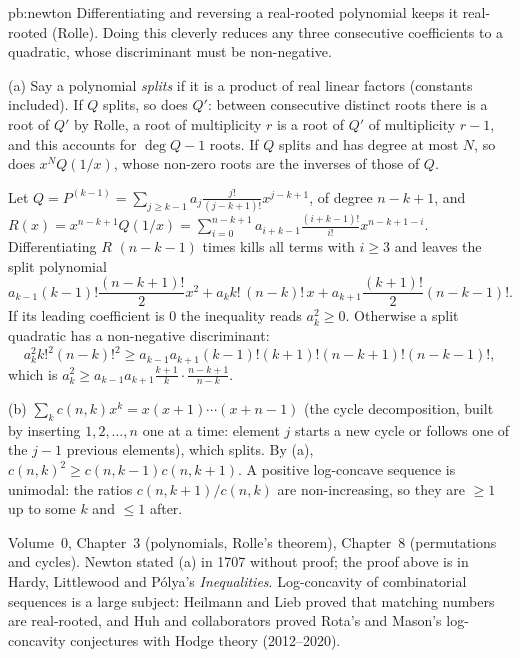 \begin{solution}{pb:newton}
\idea Differentiating and reversing a real-rooted polynomial keeps it real-rooted (Rolle). Doing this cleverly reduces any three
consecutive coefficients to a quadratic, whose discriminant must be non-negative.

\writeup (a) Say a polynomial \emph{splits} if it is a product of real linear factors (constants included). If $Q$ splits, so does $Q'$:
between consecutive distinct roots there is a root of $Q'$ by Rolle, a root of multiplicity $r$ is a root of $Q'$ of multiplicity
$r-1$, and this accounts for $\deg Q-1$ roots. If $Q$ splits and has degree at most $N$, so does $x^NQ(1/x)$, whose non-zero roots are the
inverses of those of $Q$.

Let $Q=P^{(k-1)}=\sum_{j\ge k-1}a_j\frac{j!}{(j-k+1)!}x^{j-k+1}$, of degree $n-k+1$, and $R(x)=x^{n-k+1}Q(1/x)=\sum_{i=0}^{n-k+1}a_{i+k-1}\frac{(i+k-1)!}{i!}x^{n-k+1-i}$.
Differentiating $R$ $(n-k-1)$ times kills all terms with $i\ge3$ and leaves the split polynomial
\[
a_{k-1}(k-1)!\frac{(n-k+1)!}2x^2+a_kk!\,(n-k)!\,x+a_{k+1}\frac{(k+1)!}2(n-k-1)!.
\]
If its leading coefficient is $0$ the inequality reads $a_k^2\ge0$. Otherwise a split quadratic has a non-negative discriminant:
\[
a_k^2k!^2(n-k)!^2\ge a_{k-1}a_{k+1}(k-1)!(k+1)!(n-k+1)!(n-k-1)!,
\]
which is $a_k^2\ge a_{k-1}a_{k+1}\frac{k+1}k\cdot\frac{n-k+1}{n-k}$.

(b) $\sum_kc(n,k)x^k=x(x+1)\cdots(x+n-1)$ (the cycle decomposition, built by inserting $1,2,\dots,n$ one at a time: element $j$ starts a new
cycle or follows one of the $j-1$ previous elements), which splits. By (a), $c(n,k)^2\ge c(n,k-1)c(n,k+1)$. A positive log-concave
sequence is unimodal: the ratios $c(n,k+1)/c(n,k)$ are non-increasing, so they are $\ge1$ up to some $k$ and $\le1$ after.

\tools Volume~0, Chapter~3 (polynomials, Rolle's theorem), Chapter~8 (permutations and cycles).
\leads Newton stated (a) in 1707 without proof; the proof above is in Hardy, Littlewood and Pólya's \emph{Inequalities}. Log-concavity of
combinatorial sequences is a large subject: Heilmann and Lieb proved that matching numbers are real-rooted, and Huh and
collaborators proved Rota's and Mason's log-concavity conjectures with Hodge theory (2012--2020).
\end{solution}

